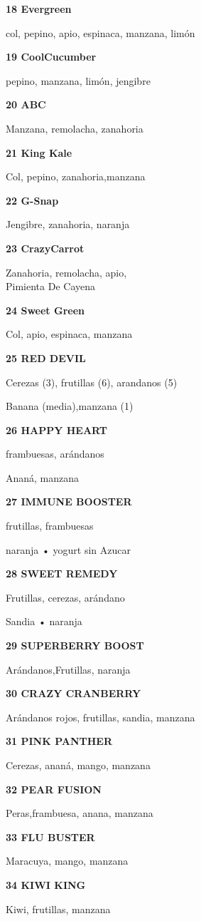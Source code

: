 \textbf{18 Evergreen}

col, pepino, apio, espinaca, manzana, limón~

\textbf{19 CoolCucumber}

pepino, manzana, limón, jengibre~

\textbf{20 ABC}

Manzana, remolacha, zanahoria

\textbf{21 King Kale}

Col, pepino, zanahoria,manzana

\textbf{22 G-Snap}

Jengibre, zanahoria, naranja

\textbf{23 CrazyCarrot}

Zanahoria, remolacha, apio,~\\
Pimienta De Cayena

\textbf{24 Sweet Green}

Col, apio, espinaca, manzana~

\textbf{25 RED DEVIL}

Cerezas (3), frutillas (6), arandanos (5)

Banana (media),manzana (1)

\textbf{26 HAPPY HEART}

frambuesas, arándanos

Ananá, manzana

\textbf{27 IMMUNE BOOSTER}

frutillas, frambuesas

naranja • yogurt sin Azucar

\textbf{28 SWEET REMEDY}

Frutillas, cerezas, arándano

Sandia • naranja

\textbf{29 SUPERBERRY BOOST}

Arándanos,Frutillas, naranja

\textbf{30 CRAZY CRANBERRY}

Arándanos rojos, frutillas, sandia, manzana

\textbf{31 PINK PANTHER}

Cerezas, ananá, mango, manzana

\textbf{32 PEAR FUSION}

Peras,frambuesa, anana, manzana

\textbf{33 FLU BUSTER}

Maracuya, mango, manzana

\textbf{34 KIWI KING}

Kiwi, frutillas, manzana

